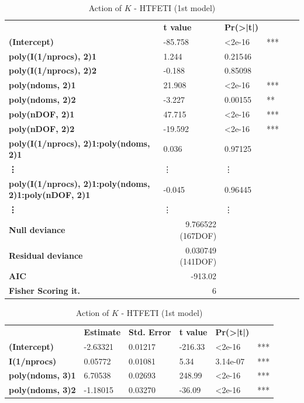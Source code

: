 \begin{table}[!hptb]
\centering
\scriptsize
\begin{tabular}{llllll}
 & \textbf{t value} & \textbf{Pr(\textgreater|t|)} & \textbf{} \\
\textbf{(Intercept)} & -85.758 & \textless 2e-16 & *** \\
\textbf{poly(I(1/nprocs), 2)1} & 1.244 & 0.21546 &  \\
\textbf{poly(I(1/nprocs), 2)2} & -0.188 & 0.85098 &  \\
\textbf{poly(ndoms, 2)1} & 21.908 & \textless 2e-16 & *** \\
\textbf{poly(ndoms, 2)2} & -3.227 & 0.00155 & ** \\
\textbf{poly(nDOF, 2)1} & 47.715 & \textless 2e-16 & *** \\
\textbf{poly(nDOF, 2)2} & -19.592 & \textless 2e-16 & *** \\
\textbf{poly(I(1/nprocs), 2)1:poly(ndoms, 2)1} & 0.036 & 0.97125 &  \\
\textbf{\vdots} & \vdots & \vdots &  \\
\textbf{poly(I(1/nprocs), 2)1:poly(ndoms, 2)1:poly(nDOF, 2)1} & -0.045 & 0.96445 &  \\
\textbf{\vdots} & \vdots & \vdots &  \\
\hhline{====}
\textbf{Null deviance} & \multicolumn{1}{r}{9.766522 (167DOF)} &  &  \\
\textbf{Residual deviance} & \multicolumn{1}{r}{0.030749 (141DOF)} &  &  \\
\textbf{AIC} & \multicolumn{1}{r}{-913.02} &  &  \\
\textbf{Fisher Scoring it.} & \multicolumn{1}{r}{6} &  & 
\end{tabular}
\caption{Action of $K$ - HTFETI (1st model)}
\label{tab:actionKHTFETI}
\vspace{1.5em}
\scriptsize
\begin{tabular}{llllll}
 & \textbf{Estimate} & \textbf{Std. Error} & \textbf{t value} & \textbf{Pr(\textgreater|t|)} &  \\
\textbf{(Intercept)} & -2.63321 & 0.01217 & -216.33 & \textless 2e-16 & *** \\
\textbf{I(1/nprocs)} & 0.05772 & 0.01081 & 5.34 & 3.14e-07 & *** \\
\textbf{poly(ndoms, 3)1} & 6.70538 & 0.02693 & 248.99 & \textless 2e-16 & *** \\
\textbf{poly(ndoms, 3)2} & -1.18015 & 0.03270 & -36.09 & \textless 2e-16 & *** \\

\end{tabular}
\end{table}

